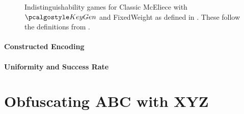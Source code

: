 \begin{figure}
    
    \caption{Indistinguishability games for Classic McEliece with $\kgen$ and \textsf{FixedWeight} as defined in \cite{NISTPQC-R4:ClassicMcEliece22}. These follow the definitions from \cite[Definition~K.1]{EC:Xagawa22}.}
    \label{fig:classic-mceliece-assumptions}
\end{figure}

\paragraph{Constructed Encoding}

\paragraph{Uniformity and Success Rate}


\section{Obfuscating ABC with XYZ} \label{sec:tbd}

